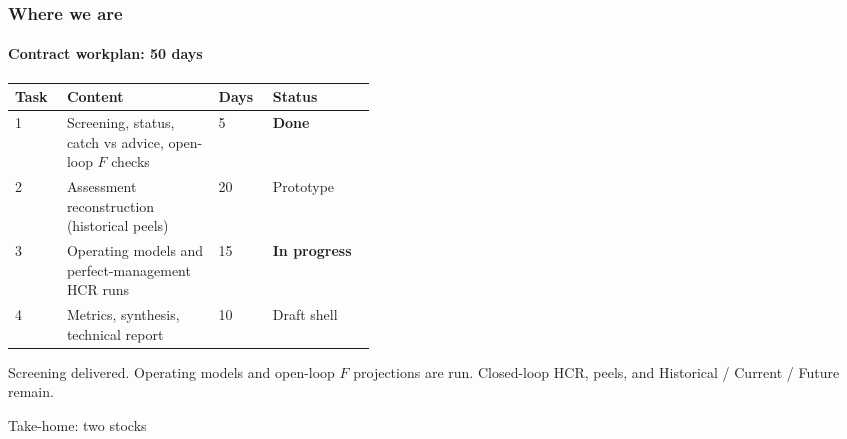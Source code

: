 \documentclass[
  aspectratio=169,
  t,
  onlytextwidth,
  10pt,
]{beamer}
\begin{document}
\begin{frame}
  \frametitle{Where we are}
  \framesubtitle{Contract workplan: 50 days}

  {\small
  \begin{tabular}{@{}lp{0.42\linewidth}ll@{}}
    \toprule
    Task & Content & Days & Status \\
    \midrule
    1 & Screening, status, catch vs advice, open-loop $F$ checks & 5 & \textbf{Done} \\
    2 & Assessment reconstruction (historical peels) & 20 & Prototype \\
    3 & Operating models and perfect-management HCR runs & 15 & \textbf{In progress} \\
    4 & Metrics, synthesis, technical report & 10 & Draft shell \\
    \bottomrule
  \end{tabular}}

  \vspace{0.7em}
  Screening delivered. Operating models and open-loop $F$ projections are run.
  Closed-loop HCR, peels, and Historical / Current / Future remain.
\end{frame}

\begingroup
  \begin{frame}
    \begin{adjustwidth}{0cm}{0.12\textwidth}
      {\Huge\ImperialSansSemiBold Take-home: two stocks}
    \end{adjustwidth}
  \end{frame}
\endgroup
\end{document}
